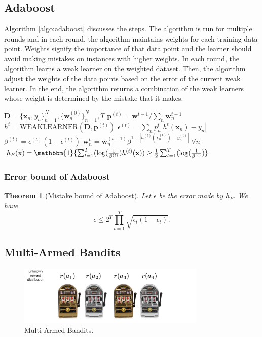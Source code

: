 \documentclass[11pt]{article}
\newtheorem{theorem}{Theorem}
\begin{document}
\subsection{Adaboost}
Algorithm \ref{algo:adaboost} discusses the steps. The algorithm is run for multiple rounds and in each round, the algorithm maintains weights for each training data point. Weights signify the importance of that data point and the learner should avoid making mistakes on instances with higher weights. In each round, the algorithm learns a weak learner on the weighted dataset. Then, the algorithm adjust the weights of the data points based on the error of the current weak learner. In the end, the algorithm returns a combination of the weak learners whose weight is determined by the mistake that it makes. 
\begin{algorithm}[H]
\caption{Adaboost}
\label{algo:adaboost}
\begin{algorithmic}[1]
\REQUIRE $\textbf{D} = \{\textbf{x}_n, y_n\}_{n=1}^N, \{\textbf{w}_n^{(0)}\}_{n=1}^N, T$
\STATE $\textbf{p}^{(t)} = \textbf{w}^{t-1} / \sum_{n} \textbf{w}_n^{t-1}$
\STATE $h^{t} = \text{WEAKLEARNER}(\textbf{D}, \textbf{p}^{(t)})$
\STATE $\epsilon^{(t)} = \sum_{n} p^{t}_n |h^{t}(\textbf{x}_n) - y_n|$
\STATE $\beta^{(t)} = \epsilon^{(t)}(1-\epsilon^{(t)})$
\STATE $\textbf{w}^{t}_n = \textbf{w}^{(t-1)}_n \beta^{1-|h^{(t)}(\textbf{x}^{(t)}_n)-y^{(t)}_n|} \; \forall n$
\ENDFOR
\STATE $h_F(\textbf{x}) = \mathbbm{1}\{ \sum_{t=1}^T (\log(\frac{1}{\beta^{(t)}}) h^{(t)}(\textbf{x})) \geq \frac{1}{2} \sum_{t=1}^T (\log(\frac{1}{\beta^{(t)}}) \}$
\end{algorithmic}
\end{algorithm}

\subsubsection{Error bound of Adaboost}

\begin{theorem}[Mistake bound of Adaboost]
Let $\epsilon$ be the error made by $h_F$. We have
\[\epsilon \leq 2^T \prod_{t=1}^T \sqrt{\epsilon_t(1-\epsilon_t)}.\]
\label{theorm:adaboost}
\end{theorem}

\subsection{Multi-Armed Bandits}

\begin{figure}[H]
    \centering
    \includegraphics[width=0.8\textwidth]{figs/bandits.png}
    \caption{Multi-Armed Bandits.}
\end{figure}
\end{document}

